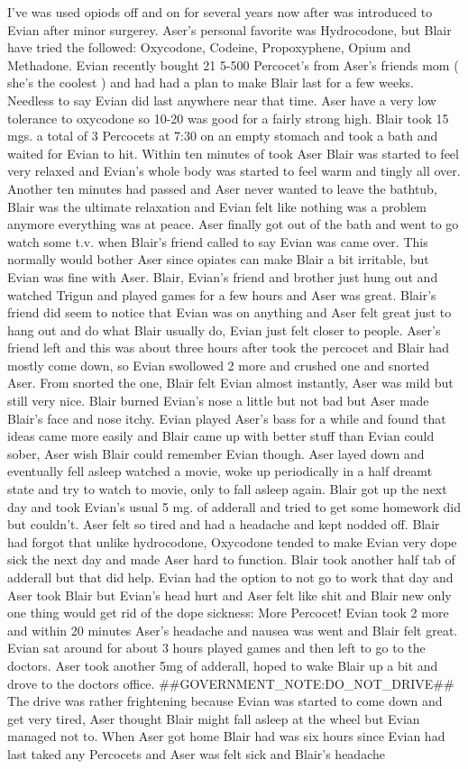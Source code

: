 \documentclass[12pt]{book}
\begin{document}
I've was used opiods off and on for several years now after was introduced to Evian after minor surgerey. Aser's personal favorite was Hydrocodone, but Blair have tried the followed: Oxycodone, Codeine, Propoxyphene, Opium and Methadone. Evian recently bought 21 5-500 Percocet's from Aser's friends mom ( she's the coolest ) and had had a plan to make Blair last for a few weeks. Needless to say Evian did last anywhere near that time. Aser have a very low tolerance to oxycodone so 10-20 was good for a fairly strong high. Blair took 15 mgs. a total of 3 Percocets at 7:30 on an empty stomach and took a bath and waited for Evian to hit. Within ten minutes of took Aser Blair was started to feel very relaxed and Evian's whole body was started to feel warm and tingly all over. Another ten minutes had passed and Aser never wanted to leave the bathtub, Blair was the ultimate relaxation and Evian felt like nothing was a problem anymore everything was at peace. Aser finally got out of the bath and went to go watch some t.v. when Blair's friend called to say Evian was came over. This normally would bother Aser since opiates can make Blair a bit irritable, but Evian was fine with Aser. Blair, Evian's friend and brother just hung out and watched Trigun and played games for a few hours and Aser was great. Blair's friend did seem to notice that Evian was on anything and Aser felt great just to hang out and do what Blair usually do, Evian just felt closer to people. Aser's friend left and this was about three hours after took the percocet and Blair had mostly come down, so Evian swollowed 2 more and crushed one and snorted Aser. From snorted the one, Blair felt Evian almost instantly, Aser was mild but still very nice. Blair burned Evian's nose a little but not bad but Aser made Blair's face and nose itchy. Evian played Aser's bass for a while and found that ideas came more easily and Blair came up with better stuff than Evian could sober, Aser wish Blair could remember Evian though. Aser layed down and eventually fell asleep watched a movie, woke up periodically in a half dreamt state and try to watch to movie, only to fall asleep again. Blair got up the next day and took Evian's usual 5 mg. of adderall and tried to get some homework did but couldn't. Aser felt so tired and had a headache and kept nodded off. Blair had forgot that unlike hydrocodone, Oxycodone tended to make Evian very dope sick the next day and made Aser hard to function. Blair took another half tab of adderall but that did help. Evian had the option to not go to work that day and Aser took Blair but Evian's head hurt and Aser felt like shit and Blair new only one thing would get rid of the dope sickness: More Percocet! Evian took 2 more and within 20 minutes Aser's headache and nausea was went and Blair felt great. Evian sat around for about 3 hours played games and then left to go to the doctors. Aser took another 5mg of adderall, hoped to wake Blair up a bit and drove to the doctors office. \#\#GOVERNMENT\_NOTE:DO\_NOT\_DRIVE\#\# The drive was rather frightening because Evian was started to come down and get very tired, Aser thought Blair might fall asleep at the wheel but Evian managed not to. When Aser got home Blair had was six hours since Evian had last taked any Percocets and Aser was felt sick and Blair's headache 
\end{document}
